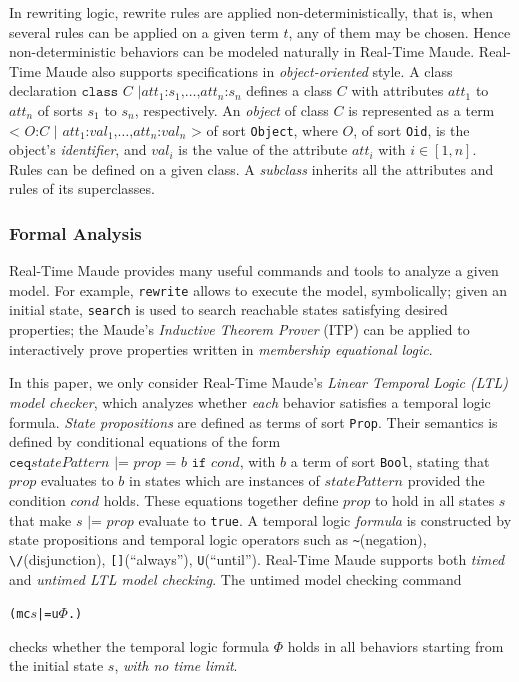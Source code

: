\documentclass[12pt,onecolumn]{IEEEtranTIE}
\begin{document}
In rewriting logic, rewrite rules are applied non-deterministically,
that is, when several rules can be applied on a given term $t$, any of
them may be chosen. Hence non-deterministic behaviors can be modeled
naturally in Real-Time Maude.  Real-Time Maude also supports
specifications in \emph{object-oriented} style.  A class declaration
$\texttt{class }C\texttt{ |
}att_1\texttt{:}s_1\texttt{,}\ldots\texttt{,}att_n\texttt{:}s_n$
defines a class $C$ with attributes $att_1$ to $att_n$ of sorts $s_1$
to $s_n$, respectively. An \emph{object} of class $C$ is represented
as a term $\texttt{< } O\texttt{:} C \texttt{ | }
att_1\texttt{:}val_1\texttt{,} \ldots
\texttt{,}att_n\texttt{:}val_n\texttt{ >}$ of sort \verb|Object|,
where $O$, of sort \verb|Oid|, is the object's \emph{identifier}, and
$val_i$ is the value of the attribute $att_i$ with $i\in [1,n]$. Rules
can be defined on a given class. A \emph{subclass} inherits all the
attributes and rules of its superclasses.

\subsubsection{Formal Analysis}
Real-Time Maude provides many useful commands and tools to analyze a
given model. For example, \verb|rewrite| allows to execute the model,
symbolically; given an initial state, \verb|search| is used to search
reachable states satisfying desired properties; the Maude's
\emph{Inductive Theorem Prover} (ITP) can be applied to interactively
prove properties written in \emph{membership equational logic}.

In this paper, we only consider Real-Time Maude's \emph{Linear
  Temporal Logic (LTL) model checker}, which analyzes whether
\emph{each} behavior satisfies a temporal logic formula. \emph{State
  propositions} are defined as terms of sort \verb|Prop|. Their
semantics is defined by conditional equations of the form\\ $\texttt{ceq
} \mathit{statePattern} \texttt{ |= } \mathit{prop} \texttt{ = } b
\texttt{ if } cond$, with $b$ a term of sort \verb|Bool|, stating that
$\mathit{prop}$ evaluates to $b$ in states which are instances of
$\mathit{statePattern}$ provided the condition $cond$ holds. These
equations together define $\mathit{prop}$ to hold in all states $s$
that make $s \texttt{ |= } \mathit{prop}$ evaluate to \verb|true|. A
temporal logic \emph{formula} is constructed by state propositions and
temporal logic operators such as \verb|~|(negation),
\verb|\/|(disjunction), \verb|[]|(``always''),
\verb|U|(``until''). Real-Time Maude supports both \emph{timed} and
\emph{untimed LTL model checking}. The untimed model checking command
\begin{alltt}
  (mc \(s\) |=u \(\Phi\) .)
\end{alltt}
checks whether the temporal logic formula $\Phi$ holds in all
behaviors starting from the initial state $s$, \emph{with no time
  limit}.
\end{document}
